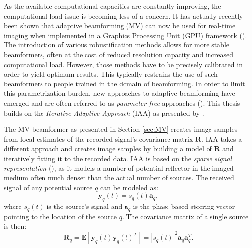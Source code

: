 As the available computational capacities are constantly improving, the computational load issue is becoming less of a concern. It has actually recently been shown that adaptive beamforming (MV) can now be used for real-time imaging when implemented in a Graphics Processing Unit (GPU) framework (\cite{GPU}).
The introduction of various robustification methods allows for more stable beamformers, often at the cost of reduced resolution capacity and increased computational load. However, those methods have to be precisely calibrated in order to yield optimum results. This typically restrains the use of such beamformers to people trained in the domain of beamforming.
In order to limit this parametrization burden, new approaches to adaptive beamforming have emerged and are often referred to as \textit{parameter-free} approaches (\cite{Yardibi_nonparametric_IAA, Yardibi, Du_parameter_free, Jensen_IAA}). This thesis builds on the \textit{Iterative Adaptive Approach} (IAA) as presented by \cite{Jensen_IAA}.

The MV beamformer as presented in Section \ref{sec:MV} creates image samples from local estimates of the recorded signal's covariance matrix $\boldsymbol{R}$.
IAA takes a different approach and creates image samples by building a model of $\boldsymbol{R}$ and iteratively fitting it to the recorded data.
IAA is based on the \textit{sparse signal representation} (\cite{Yardibi_nonparametric_IAA}), as it models a number of potential reflector in the imaged medium often much denser than the actual number of sources. The received signal of any potential source $q$ can be modeled as:
\begin{equation}
    \boldsymbol{y}_q(t) = s_q(t)  \boldsymbol{a}_q,
\end{equation}
\noindent
where $s_q(t)$ is the source's signal and $\boldsymbol{a}_q$ is the phase-based steering vector pointing to the location of the source $q$. The covariance matrix of a single source is then:
\begin{equation}
    \boldsymbol{R}_q = \boldsymbol{E}[\boldsymbol{y}_q(t) \boldsymbol{y}_q(t)^T] = |s_q(t)|^2 \boldsymbol{a}_q \boldsymbol{a}_q^T.
\end{equation}

